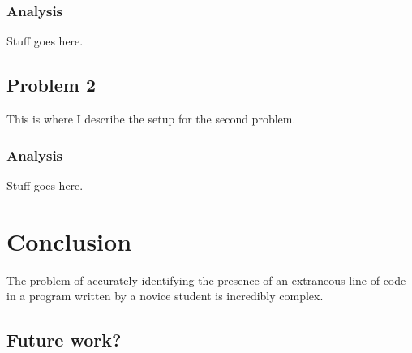 \documentclass[draft]{article}
\begin{document}


\subsubsection{Analysis}
Stuff goes here.


\subsection{Problem 2}



This is where I describe the setup for the second problem.










\subsubsection{Analysis}
Stuff goes here. 

\section{Conclusion}

The problem of accurately identifying the presence of an extraneous line of code in a program written by a novice student is incredibly complex. 

\subsection{Future work?}
\end{document}
